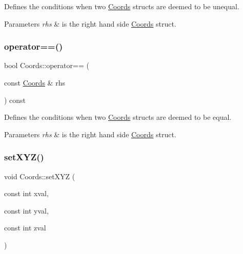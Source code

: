 Defines the conditions when two \hyperlink{struct_coords}{Coords} structs are deemed to be unequal. 


\begin{DoxyParams}{Parameters}
{\em rhs} & is the right hand side \hyperlink{struct_coords}{Coords} struct. \\
\hline
\end{DoxyParams}
\mbox{\label{struct_coords_ad3347f6568814df1a2b98b3cd0b78632}} 
\subsubsection{\texorpdfstring{operator==()}{operator==()}}
{\footnotesize\ttfamily bool Coords\+::operator== (\begin{DoxyParamCaption}\item[{const \hyperlink{struct_coords}{Coords} \&}]{rhs }\end{DoxyParamCaption}) const\hspace{0.3cm}{\ttfamily [inline]}}



Defines the conditions when two \hyperlink{struct_coords}{Coords} structs are deemed to be equal. 


\begin{DoxyParams}{Parameters}
{\em rhs} & is the right hand side \hyperlink{struct_coords}{Coords} struct. \\
\hline
\end{DoxyParams}
\mbox{\label{struct_coords_a88de3a6ee710766eb9c9444cee45a9f3}} 
\subsubsection{\texorpdfstring{set\+X\+Y\+Z()}{setXYZ()}}
{\footnotesize\ttfamily void Coords\+::set\+X\+YZ (\begin{DoxyParamCaption}\item[{const int}]{xval,  }\item[{const int}]{yval,  }\item[{const int}]{zval }\end{DoxyParamCaption})\hspace{0.3cm}{\ttfamily [inline]}}




